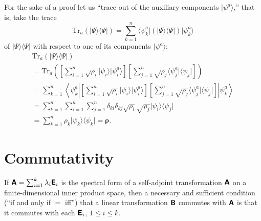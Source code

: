 {\color{OliveGreen}\bproof
For the sake of a proof let us ``trace out of the auxiliary components $\vert \psi^a\rangle$,'' that is,
take the trace
\begin{equation}
\textrm{Tr}_{a} (\vert \Psi\rangle \langle \Psi \vert )
=
\sum_{k=1}^n  \langle \psi^a_{k} \vert  (\vert \Psi\rangle \langle \Psi \vert ) \vert \psi^a_{k}\rangle
\end{equation}
of
$\vert \Psi\rangle \langle \Psi \vert$
with respect to one of its components $\vert \psi^a\rangle$:
\begin{equation}
\begin{split}
\textrm{Tr}_{a}\left(
\vert \Psi\rangle \langle \Psi \vert
\right)
\\=
\textrm{Tr}_{a}\left(
\left[\sum_{i=1}^n \sqrt{\rho_{i}}  \vert \psi_{i}\rangle  \vert \psi^a_{i}\rangle \right]
\left[\sum_{j=1}^n \sqrt{\rho_{j}}  \langle  \psi^a_{j}\vert \langle \psi_{j}\vert \right]
\right)
\\=
\sum_{k=1}^n  \left\langle \psi^a_{k} \left\vert
\left[\sum_{i=1}^n \sqrt{\rho_{i}}  \vert \psi_{i}\rangle  \vert \psi^a_{i}\rangle \right]
\left[\sum_{j=1}^n \sqrt{\rho_{j}}  \langle  \psi^a_{j}\vert \langle \psi_{j}\vert \right]
\right\vert \psi^a_{k}\right\rangle
\\=
\sum_{k=1}^n \sum_{i=1}^n \sum_{j=1}^n  \delta_{ki} \delta_{kj}
\sqrt{\rho_{i}} \sqrt{\rho_{j}}
\vert \psi_{i}\rangle
\langle \psi_{j}\vert
\\=
\sum_{k=1}^n
\rho_{k}
\vert \psi_{k}\rangle
\langle \psi_{k}\vert
= {\boldsymbol{\rho}}
.
\label{2015-puranproof1}
\end{split}
\end{equation}
}






\section{Commutativity}


If $\textsf{\textbf{A}}=\sum_{i=1}^k \lambda_i\textsf{\textbf{E}}_i$
is the spectral form of a self-adjoint transformation  $\textsf{\textbf{A}}$
on a finite-dimensional inner product space,
then a necessary and sufficient condition (``if and only if $=$ iff'')
that a linear transformation
 $\textsf{\textbf{B}}$ commutes with
 $\textsf{\textbf{A}}$
is that it commutes with each
$\textsf{\textbf{E}}_i$, $1\le i\le k$.

